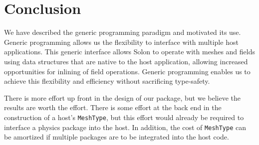 \documentclass[reqno]{lanl}
\begin{document}
\section{Conclusion}

We have described the generic programming paradigm
and motivated its use.
Generic programming allows us the flexibility to interface with multiple
host applications.
This generic interface allows Solon to operate with meshes and fields using
data structures that are native to the host application, allowing increased
opportunities for inlining of field operations.
Generic programming enables  us to achieve this flexibility
and efficiency without sacrificing type-safety.

There is more effort up front in the design of our package, but we 
believe the results are worth the effort.
There is some effort at the back end in the construction of a host's
\texttt{MeshType}, but this effort would already be
required to interface a physics package into the host.
In addition, the cost of \texttt{MeshType} can be amortized if multiple
packages are to be integrated into the host code.





%
\end{document}
